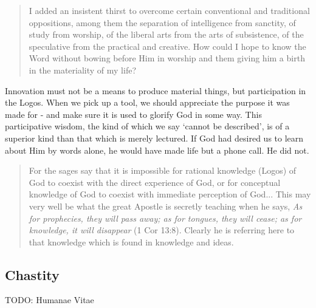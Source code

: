 \documentclass[letterpaper]{article}
\begin{document}
\begin{quote}
  I added an insistent thirst to overcome certain conventional and traditional oppositions, among them the separation of intelligence from sanctity, of study from worship, of the liberal arts from the arts of subsistence, of the speculative from the practical and creative. How could I hope to know the Word without bowing before Him in worship and them giving him a birth in the materiality of my life?
\end{quote}


Innovation must not be a means to produce material things, but participation in the Logos. When we pick up a tool, we should appreciate the purpose it was made for - and make sure it is used to glorify God in some way. This participative wisdom, the kind of which we say `cannot be described', is of a superior kind than that which is merely lectured. If God had desired us to learn about Him by words alone, he would have made life but a phone call. He did not.

\begin{quote}
  For the sages say that it is impossible for rational knowledge (Logos) of God to coexist with the direct experience of God, or for conceptual knowledge of God to coexist with immediate perception of God... This may very well be what the great Apostle is secretly teaching when he says, \textit{As for prophecies, they will pass away; as for tongues, they will cease; as for knowledge, it will disappear} (1 Cor 13:8). Clearly he is referring here to that knowledge which is found in knowledge and ideas.
\end{quote}

\subsection{Chastity}

TODO: Humanae Vitae

\hfill

\hfill

\hfill

\hfill

\hfill

\hfill
\end{document}
